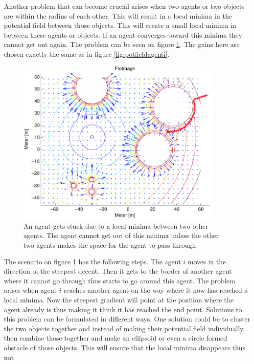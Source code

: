 Another problem that can become crucial arises when two agents or two
objects are within the radius of each other. This will result in a
local minima in the potential field between those objects. This will
create a small local minima in between these agents or objects. If an
agent converges toward this minima they cannot get out again. The
problem can be seen on figure \ref{fig:roevproblem}. The gains here
are chosen exactly the same as in figure \ref{fig:potfieldagenti}.
\begin{figure}[htbp]
  \includegraphics[width=0.9\textwidth]{fig/ftotmagnfigpdf3}
	\caption{An agent gets stuck due to a local minima between two other
	agents. The agent cannot get out of this minima unless the other two
	agents makes the space for the agent to pass through}
  \label{fig:roevproblem}
\end{figure}
The scenario on figure \ref{fig:roevproblem} has the following steps.
The agent $i$ moves in the direction of the steepest decent. Then it
gets to the border of another agent where it cannot go through thus
starts to go around this agent. The problem arises when agent $i$
reaches another agent on the way where it now has reached a local
minima. Now the steepest gradient will point at the position where the
agent already is thus making it think it has reached the end point.
Solutions to this problem can be formulated in different ways. One
solution could be to cluster the two objects together and instead of
making their potential field individually, then combine those together
and make an ellipsoid or even a circle formed obstacle of those
objects. This will ensure that the local minima disappears thus not
